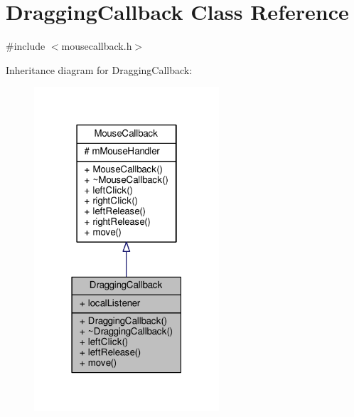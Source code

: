 \hypertarget{classDraggingCallback}{}\section{Dragging\+Callback Class Reference}
\label{classDraggingCallback}


{\ttfamily \#include $<$mousecallback.\+h$>$}



Inheritance diagram for Dragging\+Callback\+:\nopagebreak
\begin{figure}[H]
\begin{center}
\leavevmode
\includegraphics[width=195pt]{classDraggingCallback__inherit__graph}
\end{center}
\end{figure}


